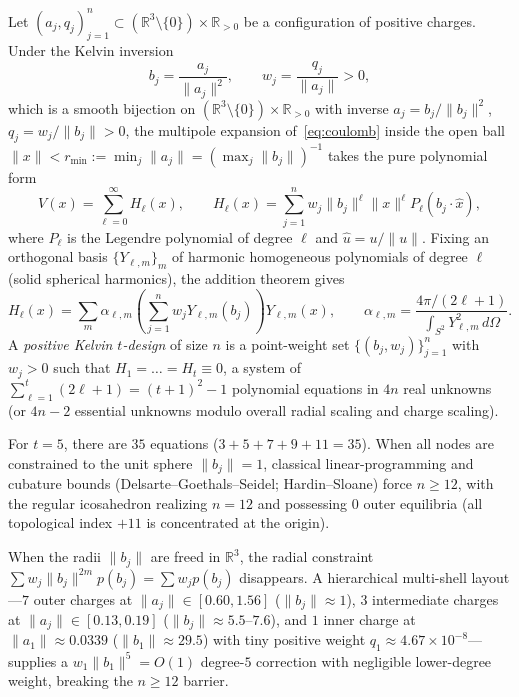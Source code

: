 \documentclass[11pt,a4paper]{amsart}
\theoremstyle{definition}
\newcommand{\R}{\mathbb{R}}
\begin{document}
Let $(a_j, q_j)_{j=1}^n \subset (\R^3 \setminus \{0\}) \times \R_{>0}$ be a
configuration of positive charges. Under the Kelvin inversion
\begin{equation}\label{eq:kelvin-map}
  b_j = \frac{a_j}{\|a_j\|^2}, \qquad w_j = \frac{q_j}{\|a_j\|} > 0,
\end{equation}
which is a smooth bijection on $(\R^3 \setminus \{0\}) \times \R_{>0}$ with
inverse $a_j = b_j / \|b_j\|^2$, $q_j = w_j / \|b_j\| > 0$, the multipole
expansion of~\eqref{eq:coulomb} inside the open ball
$\|x\| < r_{\min} := \min_j \|a_j\| = (\max_j \|b_j\|)^{-1}$ takes the pure
polynomial form
\begin{equation}\label{eq:taylor}
  V(x) = \sum_{\ell=0}^{\infty} H_\ell(x), \qquad
  H_\ell(x) = \sum_{j=1}^n w_j \|b_j\|^\ell \|x\|^\ell P_\ell(\hat{b}_j \cdot \hat{x}),
\end{equation}
where $P_\ell$ is the Legendre polynomial of degree $\ell$ and
$\hat{u} = u / \|u\|$. Fixing an orthogonal basis $\{Y_{\ell,m}\}_{m}$ of
harmonic homogeneous polynomials of degree $\ell$ (solid spherical harmonics),
the addition theorem gives
\begin{equation}\label{eq:addition}
  H_\ell(x) = \sum_{m} \alpha_{\ell,m}
  \left(\sum_{j=1}^n w_j Y_{\ell,m}(b_j)\right) Y_{\ell,m}(x),
  \qquad
  \alpha_{\ell,m} = \frac{4\pi / (2\ell + 1)}{\int_{S^2} Y_{\ell,m}^2\,d\Omega}.
\end{equation}
A \emph{positive Kelvin $t$-design} of size $n$ is a point-weight set
$\{(b_j, w_j)\}_{j=1}^n$ with $w_j > 0$ such that $H_1 = \dots = H_t \equiv 0$,
a system of $\sum_{\ell=1}^t (2\ell + 1) = (t+1)^2 - 1$ polynomial equations in
$4n$ real unknowns (or $4n - 2$ essential unknowns modulo overall radial scaling
and charge scaling).

For $t = 5$, there are $35$ equations ($3+5+7+9+11 = 35$). When all nodes are
constrained to the unit sphere $\|b_j\| = 1$, classical linear-programming and
cubature bounds (Delsarte--Goethals--Seidel; Hardin--Sloane) force $n \ge 12$,
with the regular icosahedron realizing $n = 12$ and possessing $0$ outer
equilibria (all topological index $+11$ is concentrated at the origin).

When the radii $\|b_j\|$ are freed in $\R^3$, the radial constraint
$\sum w_j \|b_j\|^{2m} p(b_j) = \sum w_j p(b_j)$ disappears. A hierarchical
multi-shell layout---$7$ outer charges at $\|a_j\| \in [0.60, 1.56]$
($\|b_j\| \approx 1$), $3$ intermediate charges at $\|a_j\| \in [0.13, 0.19]$
($\|b_j\| \approx 5.5\text{--}7.6$), and $1$ inner charge at
$\|a_1\| \approx 0.0339$ ($\|b_1\| \approx 29.5$) with tiny positive weight
$q_1 \approx 4.67 \times 10^{-8}$---supplies a $w_1 \|b_1\|^5 = O(1)$ degree-$5$
correction with negligible lower-degree weight, breaking the $n \ge 12$ barrier.
\end{document}
